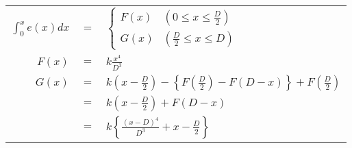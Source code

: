 \documentclass[
  11pt,
  border=2,
  convert={
    density=100 -alpha remove,
    outext=.png
  },
]{standalone}
\begin{document}
\begin{tabular}{ r c l }
  $\displaystyle \int_0^x e(x) dx$ & $=$ & $\begin{cases}
      F(x) & (0 \leq x \leq \frac{D}{2}) \\
      G(x) & (\frac{D}{2} \leq x \leq D)
    \end{cases}$\\
  $\displaystyle F(x)$ & $=$ & $\displaystyle k\frac{x^4}{D^3}$ \\
  $\displaystyle G(x)$ & $=$ & $\displaystyle k\left(x-\frac{D}{2}\right) - \left\{ F\left(\frac{D}{2}\right) - F(D-x) \right\} + F\left(\frac{D}{2}\right)$ \\
         & $=$ & $\displaystyle k\left(x-\frac{D}{2}\right) + F(D-x)$ \\
         & $=$ & $\displaystyle k\left\{\frac{(x-D)^4}{D^3} + x - \frac{D}{2}\right\}$
\end{tabular}
\end{document}
